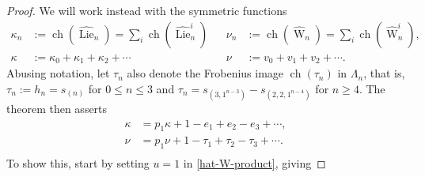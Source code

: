 \documentclass[12pt]{amsart}
\theoremstyle{plain}
\theoremstyle{definition}
\begin{document}
\begin{proof}
We will work instead with the symmetric functions
\begin{equation}
\label{kappa-nu-definition}
\begin{array}{rlcrl}
\kappa_n&:={{\operatorname{ch}}}(\widehat{{\operatorname{Lie}}}_n)=\sum_i{{\operatorname{ch}}}(\widehat{{\operatorname{Lie}}}^i_n)
     & &
\nu_n&:={{\operatorname{ch}}}(\widehat{{\operatorname{W}}}_n)=\sum_i{{\operatorname{ch}}}(\widehat{{\operatorname{W}}}^i_n),\\
\kappa&:=\kappa_0 + \kappa_1 + \kappa_2 + \cdots
    & & 
\nu&:=v_0 + v_1 + v_2 + \cdots.
\end{array}
\end{equation}
Abusing notation, let $\tau_n$
also denote the Frobenius image ${{\operatorname{ch}}}(\tau_n)$ in $\Lambda_n$, that is,
$
\tau_n:=h_n=s_{(n)}
$
for $0 \leq n \leq 3$ and
$\tau_n=s_{(3,1^{n-3})} - s_{(2,2,1^{n-4})}$  for $n \geq 4$.
The theorem then asserts
\begin{equation}
\label{symm-fn-form-of-derangement-recurrence}
\begin{aligned}
\kappa &= p_1 \kappa + 1 - e_1 + e_2 -e_3 + \cdots,\\
\nu &= p_1 \nu + 1-\tau_1+\tau_2-\tau_3+\cdots.\\
\end{aligned}
\end{equation}
To show this, start by setting $u=1$ in 
\eqref{hat-W-product}, giving


\end{proof}
\end{document}
